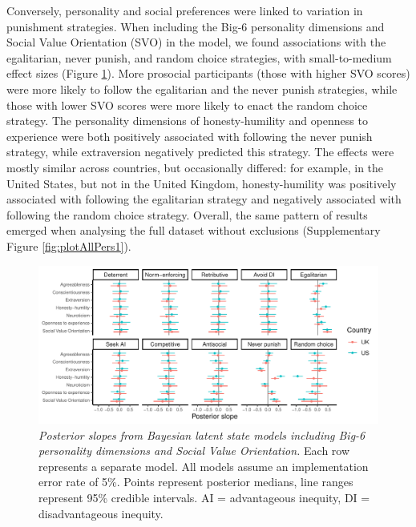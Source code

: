 \documentclass[
  man, donotrepeattitle,floatsintext]{apa6}
\begin{document}
Conversely, personality and social preferences were linked to variation in
punishment strategies. When including the Big-6 personality dimensions and
Social Value Orientation (SVO) in the model, we found associations with the
egalitarian, never punish, and random choice strategies, with small-to-medium
effect sizes (Figure \ref{fig:plotAllPers2}). More prosocial participants
(those with higher SVO scores) were more likely to follow the egalitarian and
the never punish strategies, while those with lower SVO scores were more likely
to enact the random choice strategy. The personality dimensions of
honesty-humility and openness to experience were both positively associated with
following the never punish strategy, while extraversion negatively predicted
this strategy. The effects were mostly similar across countries, but
occasionally differed: for example, in the United States, but not in the United
Kingdom, honesty-humility was positively associated with following the
egalitarian strategy and negatively associated with following the random
choice strategy. Overall, the same pattern of results emerged when analysing the
full dataset without exclusions (Supplementary Figure \ref{fig:plotAllPers1}).







\begin{figure}
\centering
\includegraphics{manuscript_files/figure-latex/plotAllPers2-1.pdf}
\caption{\label{fig:plotAllPers2}\emph{Posterior slopes from Bayesian latent state models
including Big-6 personality dimensions and Social Value Orientation.} Each row
represents a separate model. All models assume an implementation error rate of
5\%. Points represent posterior medians, line ranges represent 95\% credible
intervals. AI = advantageous inequity, DI = disadvantageous inequity.}
\end{figure}
\end{document}
